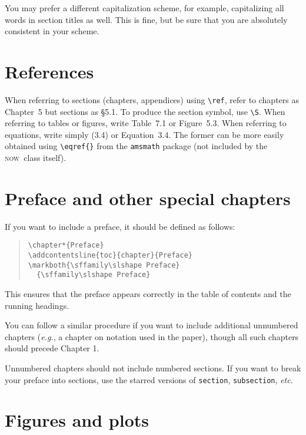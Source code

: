 \documentclass[openany]{now} %
\newcommand{\eg}{\emph{e.g.}}
\newcommand{\etc}{\emph{etc}}
\newcommand{\now}{\textsc{now}}
\begin{document}
You may prefer a different capitalization scheme, for example, 
capitalizing all words in section titles as well. This is fine, but be sure that
you are absolutely consistent in your scheme.

\section{References}

When referring to sections (chapters, appendices)
using \texttt{\textbackslash ref}, refer to chapters
as Chapter~5 but sections as \S5.1. To produce the section symbol, use
\texttt{\textbackslash S}.  When referring to tables or figures, write
Table~7.1 or Figure~5.3. When referring to equations, write simply (3.4) or
Equation~3.4. The former can be more easily obtained using
\texttt{\textbackslash eqref\{\}} from the \texttt{amsmath} package (not
included by the \now\ class itself).

\section{Preface and other special chapters}

If you want to include a preface, it should be defined as follows:
\begin{quote}
\begin{verbatim}
\chapter*{Preface}
\addcontentsline{toc}{chapter}{Preface}
\markboth{\sffamily\slshape Preface}
  {\sffamily\slshape Preface}
\end{verbatim}
\end{quote}
This ensures that the preface appears correctly in the table of contents
and the running headings.

You can follow a similar procedure if you want to include additional
unnumbered chapters (\eg, a chapter on notation used in the paper),
though all such chapters should precede Chapter 1.

Unnumbered chapters should not include numbered sections. If you want
to break your preface into sections, use the starred versions of
\texttt{section}, \texttt{subsection}, \etc.

\section{Figures and plots}
\end{document}
